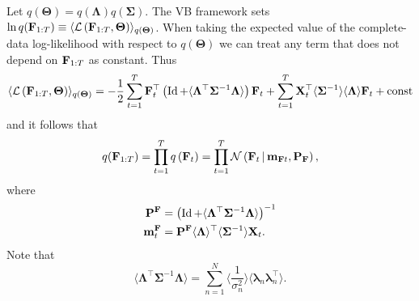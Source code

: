 Let $q(\bm \Theta) = q(\bm \Lambda) q(\bm \Sigma)$. The VB framework sets $\ln q({\bf F}_{1:T}) \equiv \langle \mathcal{L} \left( {\bf F}_{1:T}, {\bm \Theta} \right) \rangle_{q(\bm \Theta)}$. When taking the expected value of the complete-data log-likelihood with respect to $q(\bm \Theta)$ we can treat any term that does not depend on ${\bf F}_{1:T}$ as constant. Thus
\begin{equation}
	\langle \mathcal{L} \left( {\bf F}_{1:T}, {\bm \Theta} \right) \rangle_{q(\bm \Theta)} = - \frac{1}{2} \sum_{t = 1}^T {\bf F}_t^{\top} \left(\operatorname{Id} + \langle \bm \Lambda^{\top} \bm \Sigma^{-1} \bm \Lambda \rangle \right) {\bf F}_t + \sum_{t = 1}^T {\bf X}_t^{\top} \langle \bm \Sigma^{-1} \rangle \langle \bm \Lambda \rangle {\bf F}_t + \text{const}
\end{equation}
and it follows that
\begin{equation}
	q({\bf F}_{1:T}) =  \prod_{t = 1}^T q \left( {\bf F}_t \right) = \prod_{t = 1}^T \mathcal{N} \left( {\bf F}_t \,|\, {\bf m}_{{\bf F} t}, {\bf P}_{\bf F} \right),
\end{equation}
where 
\begin{align}
	{\bf P}^{\bf F}&= \left( \operatorname{Id} + \langle  \bm \Lambda^{\top} \bm \Sigma^{-1} \bm \Lambda \rangle \right)^{-1} \\
	{\bf m}_t^{\bf F} &= {\bf P}^{\bf F} \langle \bm \Lambda \rangle^{\top} \langle \bm \Sigma^{-1} \rangle {\bf X}_t.
\end{align}
Note that 
\begin{equation}
	 \langle  \bm \Lambda^{\top} \bm \Sigma^{-1} \bm \Lambda \rangle = \sum_{n = 1}^N \langle \frac{1}{\sigma^2_n}\rangle \langle {\bm \lambda}_n {\bm \lambda}_n^{\top}  \rangle.
\end{equation}


